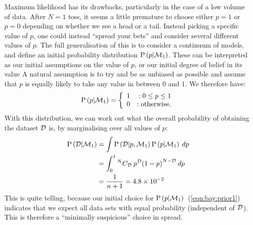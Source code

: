 Maximum likelihood has its drawbacks, particularly in the case of a low volume of data. After $N=1$ toss, it seems a little premature to choose either $p=1$ or $p=0$ depending on whether we see a head or a tail. Instead picking a specific value of $p$, one could instead ``spread your bets'' and consider several different values of $p$. The full generalisation of this is to consider a continuum of models, and define an initial probability distribution $\mathrm{P}\left(p\middle|\mathcal{M}_1\right)$. These can be interpreted as our initial assumptions on the value of $p$, or our initial degree of belief in its value
A natural assumption is to try and be as unbiased as possible and assume that $p$ is equally likely to take any value in between $0$ and $1$. We therefore have:
\begin{equation}
  \mathrm{P}\left(p\middle|\mathcal{M}_1\right)=\left\{
  \begin{array}{lr}
    1 &:0\le p\le1\\
    0 &:\text{otherwise.}\\
  \end{array}
  \right.\label{eqn:bay:prior1}
\end{equation}
With this distribution, we can work out what the overall probability of obtaining the dataset $\mathcal{D}$ is, by marginalising over all values of $p$:
\begin{align}
  \mathrm{P}\left(\mathcal{D}\middle|\mathcal{M}_1\right) 
  &= \int \mathrm{P}\left(\mathcal{D}\middle|p,\mathcal{M}_1\right)\mathrm{P}\left(p\middle|\mathcal{M}_1\right)\: dp \\
  &= \int_0^1 {^{N}C_{\mathcal{D}}}\: {p}^{\mathcal{D}} {\left(1 - p \right)}^{N-\mathcal{D}}\: dp \\
  &= \frac{1}{n+1} = 4.8\times10^{-2}
  \label{eqn:bay:marg}
\end{align}
This is quite telling, because our initial choice for $\mathrm{P}\left(p\middle|\mathcal{M}_1\right)$~(\ref{eqn:bay:prior1}) indicates that we expect all data sets with equal probability (independent of $\mathcal{D}$). This is therefore a ``minimally suspicious'' choice in spread.

